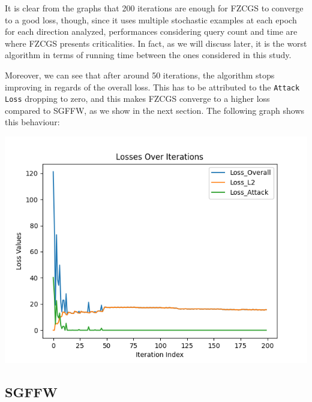\documentclass[10pt,twocolumn,letterpaper]{article}
\begin{document}
%
%

It is clear from the graphs that 200 iterations are enough for FZCGS to converge to a good loss,
though, since it uses multiple stochastic examples at each epoch for each direction analyzed, 
performances considering query count and time are where FZCGS presents criticalities.
In fact, as we will discuss later, it is the worst algorithm in terms of running time between the ones
considered in this study. 

Moreover, we can see that after around 50 iterations, the algorithm stops 
improving in regards of the overall loss. This has to be attributed to the \texttt{Attack Loss} dropping
to zero, and this makes FZCGS converge to a higher loss compared to SGFFW, as we show in the next section.
The following graph shows this behaviour:

\begin{center}
   \includegraphics*[scale=0.45]{img/FZCGS_Losses_example.png}
\end{center}


\subsection{SGFFW}
\end{document}
